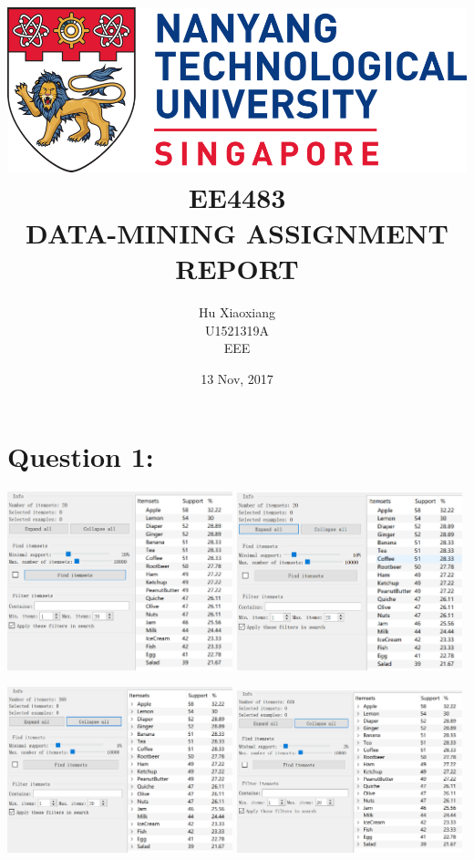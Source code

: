 \documentclass[titlepage]{article}
\author{Hu Xiaoxiang \\
U1521319A \\
EEE \\
}
\date{13 Nov, 2017 \\
}
\title{\includegraphics[width=\textwidth]{logo_ntu_new.png} \\
[5\baselineskip] EE4483 \\
DATA-MINING ASSIGNMENT \\
REPORT \\
[5\baselineskip]}
\begin{document}
\maketitle
\tableofcontents

\newpage
{}

\section{Question 1:}
\label{sec:orga422168}
\begin{center}
\includegraphics[width=0.49\textwidth]{minsup20.PNG}
\includegraphics[width=0.49\textwidth]{minsup10.PNG}
\end{center}

\begin{center}
\includegraphics[width=0.49\textwidth]{minsup5.PNG}
\includegraphics[width=0.49\textwidth]{minsup3.PNG}
\end{center}
\end{document}
